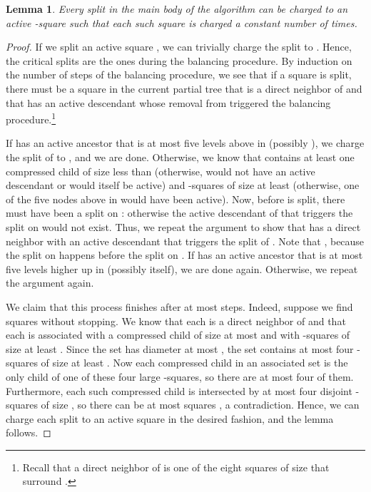 \documentclass[11pt]{paper}
\newtheorem {lem}[theorem] {Lemma}
\begin{document}
      \begin{lem}\label{lem:main-body}
         Every split in the main body of the algorithm can be charged
	 to an active -square such that each such square
	 is charged a constant number of times.
      \end{lem}

      \begin{proof}
      If we split an active square , we can trivially
      charge the split to .
      Hence, the critical splits
      are the ones during the balancing procedure. 
      By induction on the number of steps of the balancing
      procedure, we see that if a square  is split, there must be 
      a square  in the current partial tree  that is a direct 
      neighbor of  and that has an active descendant whose 
      removal from   triggered the
      balancing procedure.\footnote{Recall that a direct neighbor
      of  is one of the eight squares of size  that surround
      .}

      If  has an active ancestor  that is at 
      most five levels above  in  (possibly ), 
      we charge the split of  to
      , and we are done. Otherwise, we know that
       contains at least one compressed child of
      size less than  (otherwise,  would not
      have an active descendant or would itself be active) 
      and -squares of size at least
       (otherwise, one of the five nodes above  in  
      would have been active). Now, before  is split, there
      must have been a split on : otherwise the
      active descendant of  that triggers
      the split on  would not exist. Thus, we repeat the argument to show
      that  has a direct neighbor  with an
      active descendant that triggers the split of . 
      Note that , because the split on  happens before
      the split on .
      If  has an active ancestor that is at most five levels higher up in
       (possibly  itself), we are done again. 
      Otherwise, we repeat the argument again. 
      
      We claim that this process finishes after at most  steps. 
      Indeed, suppose we find  squares 
       without stopping. 
      We know that each  is a direct neighbor of  and that
      each  is associated with a compressed child of size
      at most  and with -squares of size at least
      . Since the set  has
      diameter at most , the set 
      contains at most four -squares of size at least .
      Now each compressed child in an associated set
       is the only child of one of these four large -squares,
      so there are at most four of them.
      Furthermore, each such compressed child is intersected by at
      most four disjoint -squares of size , so 
      there can be at most  squares , a contradiction.
      Hence, we can charge each split to an active square in the
      desired fashion, and the lemma follows.
      \end{proof}
       
\end{document}
